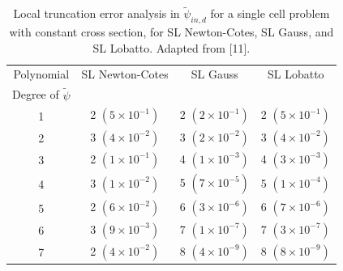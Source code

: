 \begin{table}[!htp]
\centering
\caption{Local truncation error analysis in $\widetilde{\psi}_{in,d}$ for a single cell problem with constant cross section, for SL Newton-Cotes, SL Gauss, and SL Lobatto.  Adapted from [11].}
\begin{tabular}{|c|c|c|c|} 
\hline
  Polynomial 										 & SL Newton-Cotes 				& SL Gauss 			 						& SL Lobatto  \\
  Degree  of $\widetilde{\psi}$	& {}		 							 		& {}   										&	 {}   \\
	\hline
				1   										&	2 $(5\times 10^{-1})$		&	2 $(2\times 10^{-1})$		&	2 $(5\times 10^{-1})$	\\
		\hline
				2   										& 3 $(4\times 10^{-2})$		&	3  $(2\times 10^{-2})$	&	3 $(4\times 10^{-2})$		\\
		\hline	
				3   										&	2 $(1\times 10^{-1})$		& 4 $(1\times 10^{-3})$		&	4 $(3\times 10^{-3})$	\\
		\hline
				4   										&	3 $(1\times 10^{-2})$		&	5 $(7\times 10^{-5})$		&	5 $(1\times 10^{-4})$	\\
		\hline	
				5   										&	2 $(6\times 10^{-2})$		&	6 $(3\times 10^{-6})$		&	6 $(7\times 10^{-6})$	\\
		\hline		
				6   										&	3 $(9\times 10^{-3})$		&	7 $(1\times 10^{-7})$		&	7 $(3\times 10^{-7})$	\\
		\hline		
				7   										&	2 $(4\times 10^{-2})$		&	8 $(4\times 10^{-9})$		&	8 $(8\times 10^{-9})$	\\
		\hline		
\end{tabular}
\label{tbl:taylor_in_part2} 
\end{table}
%
%
